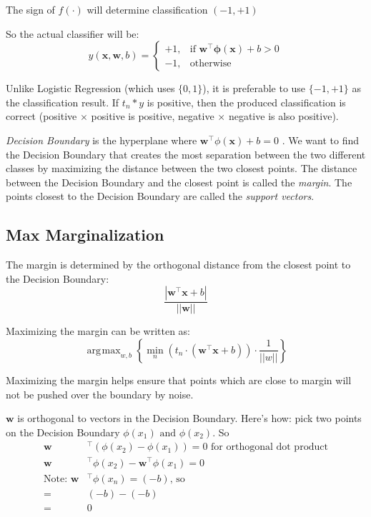 \documentclass[11pt, oneside]{article}   	%
\DeclareMathOperator*{\argmax}{\arg\!\max}
\begin{document}
The sign of $f(\cdot)$ will determine classification $(-1,+1)$

So the actual classifier will be:
\[
y(\textbf{x},\textbf{w},b) =
	\begin{cases}
	  	+1, &\text{if  }\textbf{w}^\intercal \mathbf{\phi}(\textbf{x}) + b > 0 \\
		-1, &\text{otherwise}
	\end{cases}
\]

Unlike Logistic Regression (which uses $\{0, 1\}$), it is preferable to use $\{-1, +1\}$ as the classification result. If $t_n * y$ is positive, then the produced classification is correct (positive $\times$ positive is positive, negative $\times$ negative is also positive).

\emph{Decision Boundary} is the hyperplane where $\textbf{w}^\intercal \phi(\textbf{x}) +b = 0$ . We want to find the Decision Boundary that creates the most separation between the two different classes by maximizing the distance between the two closest points. The distance between the Decision Boundary and the closest point is called the \emph{margin}. The points closest to the Decision Boundary are called the \emph{support vectors}.

\subsection {Max Marginalization}

The margin is determined by the orthogonal distance from the closest point to the Decision Boundary: 
\begin{equation}
\frac{|\textbf{w}^\intercal \textbf{x} + b|}{||\textbf{w}||}
\end{equation}


Maximizing the margin can be written as:
\begin{equation}
\argmax_{w,b} \left\{\min_n(t_n\cdot(\mathbf{w}^\intercal\mathbf{x}+b))\cdot\frac{1}{||w||} \right\}
\end{equation}

Maximizing the margin helps ensure that points which are close to margin will not be pushed over the boundary by noise.

$\mathbf{w}$ is orthogonal to vectors in the Decision Boundary. Here's how: pick two points on the Decision Boundary $\phi(x_1) \text{ and } \phi(x_2)$. So
\begin{align}
\mathbf{w}&^\intercal\left(\phi(x_2) - \phi(x_1)\right) = 0 \text{ for orthogonal dot product}\nonumber \\
\mathbf{w}&^\intercal\phi(x_2) - \mathbf{w}^\intercal\phi(x_1) = 0 \nonumber \\
\text{Note: } \mathbf{w}&^\intercal\phi(x_n) = (-b) \text{, so} \nonumber \\
=&(-b) - (-b) \nonumber \\
=& 0 \nonumber
\end{align}
\end{document}
